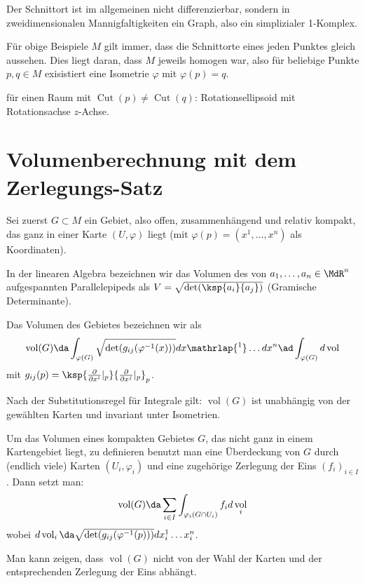\documentclass[a4paper,twoside,DIV15,BCOR12mm]{scrbook}
\DeclareMathOperator{\cut}{Cut}
\DeclareMathOperator{\vol}{vol}
\begin{document}
\begin{bemerkungen}
\item Der Schnittort ist im allgemeinen nicht differenzierbar, sondern in zweidimensionalen Mannigfaltigkeiten ein Graph, also ein simplizialer 1-Komplex.
\item Für obige Beispiele $M$ gilt immer, dass die Schnittorte eines jeden Punktes gleich aussehen. Dies liegt daran, dass $M$ jeweils homogen war, also für beliebige Punkte $p,q\in M$ exisistiert eine Isometrie $\varphi$ mit $\varphi(p)=q$.
\end{bemerkungen}

\begin{beispiel}
für einen Raum mit $\cut(p) \ne \cut(q)$: Rotationsellipsoid mit Rotationsachse $z$-Achse.
\end{beispiel}

\section{Volumenberechnung mit dem Zerlegungs-Satz}

Sei zuerst $G\subset M$ ein Gebiet, also offen, zusammenhängend und relativ kompakt, das ganz in einer Karte $(U,\varphi)$ liegt (mit $\varphi(p) = (x^1,\ldots,x^n)$ als Koordinaten).

In der linearen Algebra bezeichnen wir das Volumen des von $a_1,\ldots,a_n\in\MdR^n$ aufgespannten Parallelepipeds als $V=\sqrt{\det(\ksp {a_i} {a_j})}$ (Gramische Determinante).

\begin{definition}
Das Volumen des Gebietes bezeichnen wir als
\[
\vol(G) \da \int_{\varphi(G)} \sqrt{\det (g_{ij}(\varphi^{-1}(x)))} dx\mathrlap{^1}\ldots dx^n \ad \int_{\varphi(G)}d\vol
\] mit $g_{ij}(p) = \ksp{\frac{\partial}{\partial x^i}|_p}{\frac{\partial}{\partial x^j}|_p}_p$.
\end{definition}

Nach der Substitutionsregel für Integrale gilt: $\vol(G)$ ist unabhängig von der gewählten Karten und invariant unter Isometrien.

\begin{bemerkung}
Um das Volumen eines kompakten Gebietes $G$, das nicht ganz in einem Kartengebiet liegt, zu definieren benutzt man eine Überdeckung von $G$ durch (endlich viele) Karten $(U_i,\varphi_i)$ und eine zugehörige Zerlegung der Eins $(f_i)_{i\in I}$. Dann setzt man:
\[
\vol (G) \da \sum_{i\in I} \int_{\varphi_i(G\cap U_i)} f_i d \vol_i 
\]
wobei $d\vol_i \da \sqrt{\det(g_{ij}(\varphi^{-1}(p)))}dx_i^1\ldots x_i^n$.

Man kann zeigen, dass $\vol(G)$ nicht von der Wahl der Karten und der entsprechenden Zerlegung der Eins abhängt.
\end{bemerkung}
\end{document}
